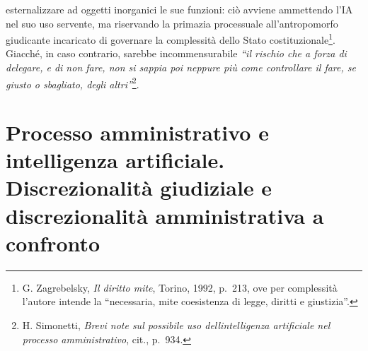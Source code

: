 \documentclass[american,a4paper,]{article}
\begin{document}
esternalizzare ad oggetti inorganici le sue funzioni: ciò avviene ammettendo l'IA nel suo uso servente, ma riservando la primazia processuale all'antropomorfo giudicante incaricato di governare la complessità dello Stato costituzionale\footnote{G. Zagrebelsky, \emph{Il diritto mite}, Torino, 1992, p.~213, ove per complessità l'autore intende la ``necessaria, mite coesistenza di legge, diritti e giustizia''.}. Giacché, in caso contrario, sarebbe incommensurabile \emph{``\emph{il rischio che a forza di delegare, e di non fare, non si sappia poi neppure più come controllare il fare, se giusto o sbagliato, degli altri}''}\footnote{H. Simonetti, \emph{Brevi note sul possibile uso dell\textquotesingle intelligenza artificiale nel processo amministrativo}, cit., p.~934.}.

\section{Processo amministrativo e intelligenza artificiale. Discrezionalità giudiziale e discrezionalità amministrativa a confronto}\label{processo-amministrativo-e-intelligenza-artificiale.-discrezionalituxe0-giudiziale-e-discrezionalituxe0-amministrativa-a-confronto}
\end{document}
